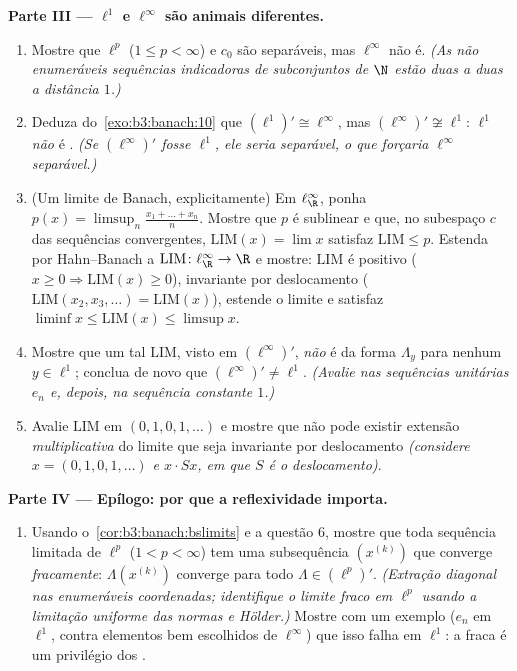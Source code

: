 \begin{problem}[{Problema de fim de semana --- $(\ell^p)' = \ell^q$, reflexividade e a
estranheza de $\ell^\infty$}]
\medskip
\noindent\textbf{Parte III --- $\ell^1$ e $\ell^\infty$ são animais
diferentes.}
\begin{enumerate}[resume]
  \item Mostre que $\ell^p$ ($1 \leq p < \infty$) e $c_0$ são separáveis, mas
        $\ell^\infty$ não é. \emph{(As não enumeráveis sequências indicadoras
        de subconjuntos de $\N$ estão duas a duas a distância
        $1$.)}
  \item Deduza do~\cref{exo:b3:banach:10} que $(\ell^1)'
        \cong \ell^\infty$, mas $(\ell^\infty)' \not\cong
        \ell^1$: $\ell^1$
        \emph{não} é . \emph{(Se $(\ell^\infty)'$ fosse $\ell^1$, ele
        seria separável, o que forçaria $\ell^\infty$ separável.)}
  \item (Um limite de Banach, explicitamente) Em $\ell^\infty_\R$, ponha $p(x) = \limsup_n \frac{x_1 + \dots + x_n}{n}$.
        Mostre que $p$ é sublinear e que, no subespaço $c$ das
        sequências convergentes, $\mathrm{LIM}(x) = \lim x$ satisfaz $\mathrm{LIM} \leq p$. Estenda por
        Hahn--Banach a $\mathrm{LIM} \colon \ell^\infty_\R \to \R$ e mostre: $\mathrm{LIM}$ é positivo ($x \geq 0 \Rightarrow
        \mathrm{LIM}(x) \geq 0$),
        invariante por deslocamento ($\mathrm{LIM}(x_2, x_3, \dots) = \mathrm{LIM}(x)$), estende o limite e
        satisfaz $\liminf x \leq
        \mathrm{LIM}(x)\leq \limsup x$.
  \item Mostre que um tal $\mathrm{LIM}$, visto em $(\ell^\infty)'$, \emph{não} é da forma
        $\Lambda_y$ para nenhum $y \in \ell^1$; conclua de novo que $(\ell^\infty)'
        \neq \ell^1$.
        \emph{(Avalie nas sequências unitárias $e_n$ e, depois, na
        sequência constante $1$.)}
  \item Avalie $\mathrm{LIM}$ em $(0,1,0,1,\dots)$ e mostre que não pode existir extensão
        \emph{multiplicativa} do limite que seja invariante por
        deslocamento \emph{(considere $x =
        (0,1,0,1,\dots)$ e $x\cdot Sx$, em que $S$ é o
        deslocamento)}.
\end{enumerate}

\medskip
\noindent\textbf{Parte IV --- Epílogo: por que a reflexividade
importa.}
\begin{enumerate}[resume]
  \item Usando o~\cref{cor:b3:banach:bslimits} e a questão 6, mostre que toda
        sequência limitada de $\ell^p$ ($1 < p <
        \infty$) tem uma subsequência
        $(x^{(k)})$ que converge \emph{fracamente}: $\Lambda(x^{(k)})$ converge para todo
        $\Lambda \in (\ell^p)'$. \emph{(Extração diagonal nas enumeráveis coordenadas;
        identifique o limite fraco em $\ell^p$ usando a limitação
        uniforme das normas e Hölder.)} Mostre com um exemplo
        ($e_n$ em $\ell^1$, contra elementos bem escolhidos de
        $\ell^\infty$) que isso falha em $\ell^1$: a  fraca é um
        privilégio dos .
\end{enumerate}


\end{problem}
